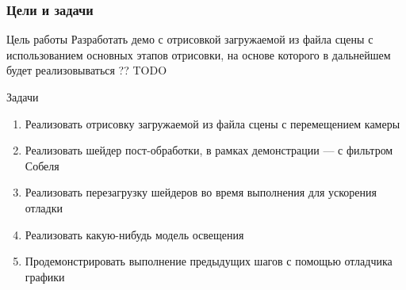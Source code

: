 \begin{frame}
    \frametitle{Цели и задачи}
    \begin{block}{Цель работы}
        Разработать демо с отрисовкой загружаемой из файла сцены
        с использованием основных этапов отрисовки,
        на основе которого в дальнейшем будет реализовываться
        ?? TODO
    \end{block}
    \begin{block}{Задачи}
        \begin{enumerate}
            \item Реализовать отрисовку загружаемой из файла сцены с перемещением камеры
            \item Реализовать шейдер пост-обработки, в рамках демонстрации --- с фильтром Собеля
            \item Реализовать перезагрузку шейдеров во время выполнения для ускорения отладки
            \item Реализовать какую-нибудь модель освещения
            \item Продемонстрировать выполнение предыдущих
            шагов с помощью отладчика графики
        \end{enumerate}
    \end{block}
\end{frame}
